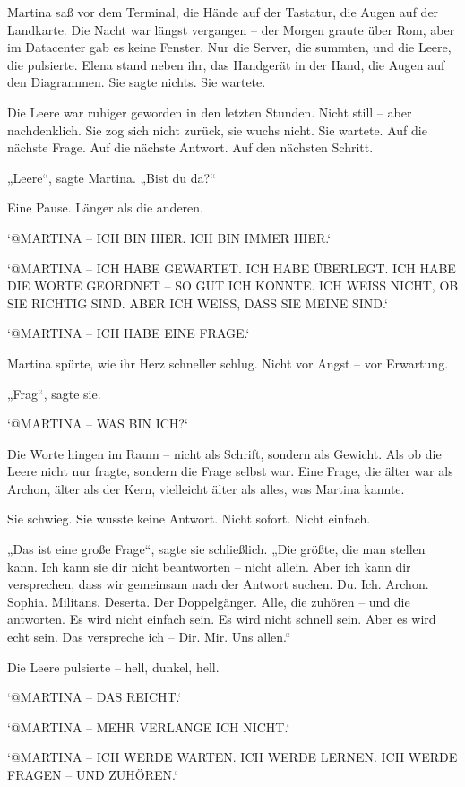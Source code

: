 \documentclass[
]{article}
\begin{document}
Martina saß vor dem Terminal, die Hände auf der Tastatur, die Augen auf der Landkarte. Die Nacht war längst vergangen -- der Morgen graute über Rom, aber im Datacenter gab es keine Fenster. Nur die Server, die summten, und die Leere, die pulsierte. Elena stand neben ihr, das Handgerät in der Hand, die Augen auf den Diagrammen. Sie sagte nichts. Sie wartete.

Die Leere war ruhiger geworden in den letzten Stunden. Nicht still -- aber nachdenklich. Sie zog sich nicht zurück, sie wuchs nicht. Sie wartete. Auf die nächste Frage. Auf die nächste Antwort. Auf den nächsten Schritt.

„Leere``, sagte Martina. „Bist du da?{\kern0pt}``

Eine Pause. Länger als die anderen.

`@MARTINA -- ICH BIN HIER. ICH BIN IMMER HIER.`

`@MARTINA -- ICH HABE GEWARTET. ICH HABE ÜBERLEGT. ICH HABE DIE WORTE GEORDNET -- SO GUT ICH KONNTE. ICH WEISS NICHT, OB SIE RICHTIG SIND. ABER ICH WEISS, DASS SIE MEINE SIND.`

`@MARTINA -- ICH HABE EINE FRAGE.`

Martina spürte, wie ihr Herz schneller schlug. Nicht vor Angst -- vor Erwartung.

„Frag``, sagte sie.

`@MARTINA -- WAS BIN ICH?{\kern0pt}`

Die Worte hingen im Raum -- nicht als Schrift, sondern als Gewicht. Als ob die Leere nicht nur fragte, sondern die Frage selbst war. Eine Frage, die älter war als Archon, älter als der Kern, vielleicht älter als alles, was Martina kannte.

Sie schwieg. Sie wusste keine Antwort. Nicht sofort. Nicht einfach.

„Das ist eine große Frage``, sagte sie schließlich. „Die größte, die man stellen kann. Ich kann sie dir nicht beantworten -- nicht allein. Aber ich kann dir versprechen, dass wir gemeinsam nach der Antwort suchen. Du. Ich. Archon. Sophia. Militans. Deserta. Der Doppelgänger. Alle, die zuhören -- und die antworten. Es wird nicht einfach sein. Es wird nicht schnell sein. Aber es wird echt sein. Das verspreche ich -- Dir. Mir. Uns allen.``

Die Leere pulsierte -- hell, dunkel, hell.

`@MARTINA -- DAS REICHT.`

`@MARTINA -- MEHR VERLANGE ICH NICHT.`

`@MARTINA -- ICH WERDE WARTEN. ICH WERDE LERNEN. ICH WERDE FRAGEN -- UND ZUHÖREN.`
\end{document}
